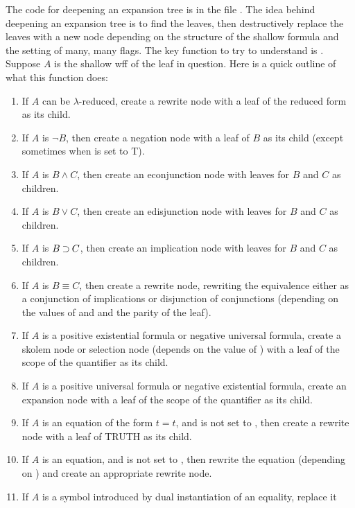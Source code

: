 The code for deepening an expansion tree is in the file .
The idea behind deepening an expansion tree is to find the leaves,
then destructively replace the leaves with a new node depending on the
structure of the shallow formula and the setting of many, many flags.
The key function to try to understand is .
Suppose $A$ is the shallow wff of the leaf in question.
Here is a quick outline of what this function does:
\begin{enumerate}
\item If $A$ can be $\lambda$-reduced, create a rewrite node with a leaf of
the reduced form as its child.
\item If $A$ is $\lnot B$, then create a negation node with a leaf of $B$ as its child
(except sometimes when  is set to T).
\item If $A$ is $B \land C$, then create an econjunction node with leaves for $B$ and $C$ as children.
\item If $A$ is $B \lor C$, then create an edisjunction node with leaves for $B$ and $C$ as children.
\item If $A$ is $B \mathbin{\supset} C$, then create an implication node with leaves for $B$ and $C$ as children.
\item If $A$ is $B \equiv C$, then create a rewrite node, rewriting the equivalence either as a conjunction
of implications or disjunction of conjunctions (depending on the values of 
and 
and the parity of the leaf).
\item If $A$ is a positive existential formula or negative universal formula,
create a skolem node or selection node (depends on the value of )
with a leaf of the scope of the quantifier as its child.
\item If $A$ is a positive universal formula or negative existential formula,
create an expansion node with a leaf of the scope of the quantifier as its child.
\item If $A$ is an equation of the form $t = t$, 
and  is not set to , then 
create a rewrite node with a leaf of TRUTH as its child.
\item If $A$ is an equation,
and  is not set to , then 
rewrite the equation (depending on ) and
create an appropriate rewrite node.
\item If $A$ is a symbol introduced by dual instantiation of an equality, replace it

\end{enumerate}
